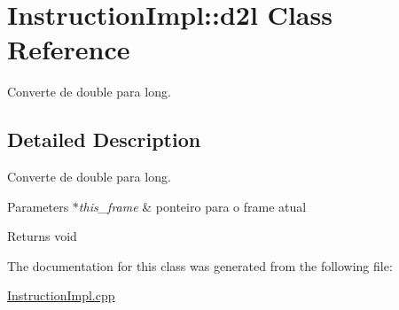 \hypertarget{class_instruction_impl_1_1d2l}{}\section{Instruction\+Impl\+:\+:d2l Class Reference}
\label{class_instruction_impl_1_1d2l}


Converte de double para long.  




\subsection{Detailed Description}
Converte de double para long. 


\begin{DoxyParams}{Parameters}
{\em $\ast$this\+\_\+frame} & ponteiro para o frame atual \\
\hline
\end{DoxyParams}
\begin{DoxyReturn}{Returns}
void 
\end{DoxyReturn}


The documentation for this class was generated from the following file\+:\begin{DoxyCompactItemize}
\item 
\hyperlink{_instruction_impl_8cpp}{Instruction\+Impl.\+cpp}\end{DoxyCompactItemize}
